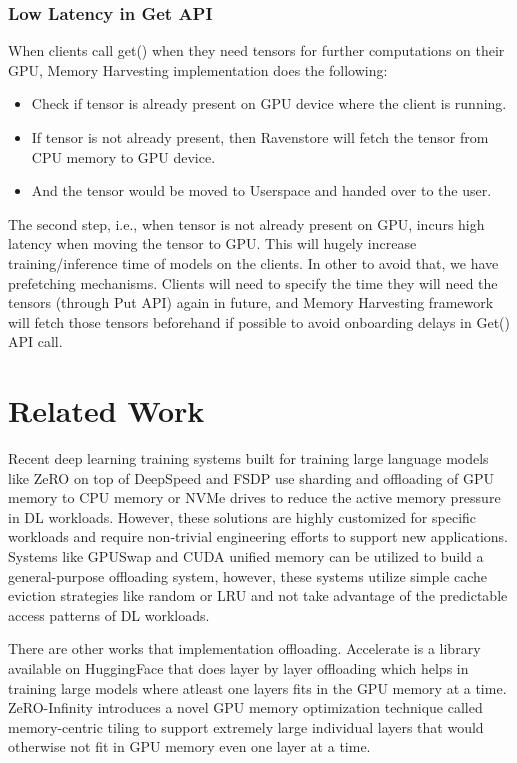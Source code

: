 \documentclass{article}
\begin{document}
	\subsubsection{Low Latency in Get API} When clients call get() when they need tensors for further computations on their GPU, Memory Harvesting implementation does the following:
	\begin{itemize}
		\item Check if tensor is already present on GPU device where the client is running.
		\item If tensor is not already present, then Ravenstore will fetch the tensor from CPU memory to GPU device.
		\item And the tensor would be moved to Userspace and handed over to the user.
	\end{itemize}
	The second step, i.e., when tensor is not already present on GPU, incurs high latency when moving the tensor to GPU.
	This will hugely increase training/inference time of models on the clients. In other to avoid that, we have prefetching mechanisms.
	Clients will need to specify the time they will need the tensors (through Put API) again in future, and Memory Harvesting framework will
	fetch those tensors beforehand if possible to avoid onboarding delays in Get() API call.

\section{Related Work}

Recent deep learning training systems built for training large language models like ZeRO \cite{zero}\cite{rajbhandari2021zero-infinity} on top of
DeepSpeed \cite{deepspeed} and FSDP \cite{jiang2023osdp} use sharding and offloading of 
GPU memory to CPU memory or NVMe drives to reduce the active memory pressure in DL workloads. However, these solutions are highly customized 
for specific workloads and require non-trivial engineering efforts to support new applications. Systems like GPUSwap \cite{gpuswap} and CUDA unified 
memory \cite{unified} can be utilized to build a general-purpose offloading system, however, these systems utilize simple cache eviction strategies 
like random or LRU and not take advantage of the predictable access patterns of DL workloads.

There are other works that implementation offloading. Accelerate\cite{accelerate} is a library available on HuggingFace that does layer by layer offloading 
which helps in training large models where atleast one layers fits in the GPU memory at a time. ZeRO-Infinity introduces a novel GPU memory 
optimization technique called memory-centric tiling to support extremely large individual layers that would otherwise not fit in GPU memory 
even one layer at a time.
\end{document}
